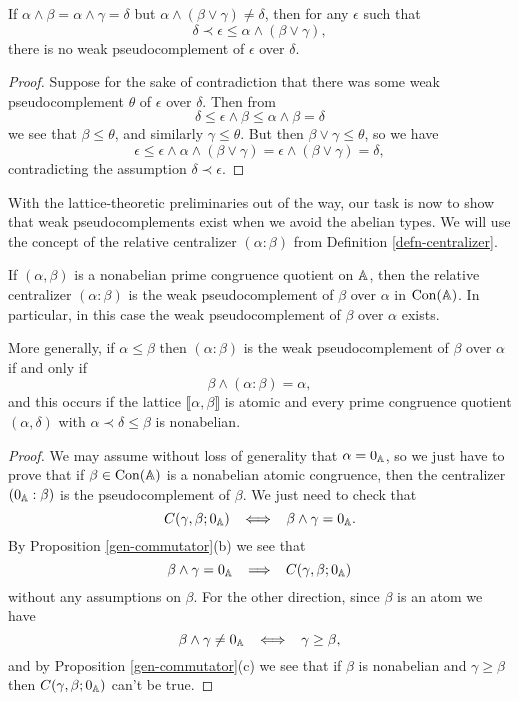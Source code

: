 \begin{appendices}
\begin{prop}\label{prop-semidistributive-prime-pseudocomplement} If $\alpha \wedge \beta = \alpha \wedge \gamma = \delta$ but $\alpha \wedge (\beta \vee \gamma) \ne \delta$, then for any $\epsilon$ such that
\[
\delta \prec \epsilon \le \alpha \wedge (\beta \vee \gamma),
\]
there is no weak pseudocomplement of $\epsilon$ over $\delta$.
\end{prop}
\begin{proof} Suppose for the sake of contradiction that there was some weak pseudocomplement $\theta$ of $\epsilon$ over $\delta$. Then from
\[
\delta \le \epsilon \wedge \beta \le \alpha \wedge \beta = \delta
\]
we see that $\beta \le \theta$, and similarly $\gamma \le \theta$. But then $\beta \vee \gamma \le \theta$, so we have
\[
\epsilon \le \epsilon \wedge \alpha \wedge (\beta \vee \gamma) = \epsilon \wedge (\beta \vee \gamma) = \delta,
\]
contradicting the assumption $\delta \prec \epsilon$.
\end{proof}

With the lattice-theoretic preliminaries out of the way, our task is now to show that weak pseudocomplements exist when we avoid the abelian types. We will use the concept of the relative centralizer $(\alpha : \beta)$ from Definition \ref{defn-centralizer}.

\begin{prop}\label{prop-centralizer-pseudocomplement} If $(\alpha, \beta)$ is a nonabelian prime congruence quotient on $\mathbb{A}$, then the relative centralizer $(\alpha : \beta)$ is the weak pseudocomplement of $\beta$ over $\alpha$ in $\operatorname{Con}(\mathbb{A})$. In particular, in this case the weak pseudocomplement of $\beta$ over $\alpha$ exists.

More generally, if $\alpha \le \beta$ then $(\alpha : \beta)$ is the weak pseudocomplement of $\beta$ over $\alpha$ if and only if
\[
\beta \wedge (\alpha : \beta) = \alpha,
\]
and this occurs if the lattice $\llbracket \alpha, \beta \rrbracket$ is atomic and every prime congruence quotient $(\alpha,\delta)$ with $\alpha \prec \delta \le \beta$ is nonabelian.
\end{prop}
\begin{proof} We may assume without loss of generality that $\alpha = 0_{\mathbb{A}}$, so we just have to prove that if $\beta \in \operatorname{Con}(\mathbb{A})$ is a nonabelian atomic congruence, then the centralizer $(0_{\mathbb{A}} : \beta)$ is the pseudocomplement of $\beta$. We just need to check that
\[
C(\gamma, \beta; 0_{\mathbb{A}}) \;\; \iff \;\; \beta \wedge \gamma = 0_{\mathbb{A}}.
\]
By Proposition \ref{gen-commutator}(b) we see that
\[
\beta \wedge \gamma = 0_{\mathbb{A}} \;\; \implies \;\; C(\gamma, \beta; 0_{\mathbb{A}})
\]
without any assumptions on $\beta$. For the other direction, since $\beta$ is an atom we have
\[
\beta \wedge \gamma \ne 0_{\mathbb{A}} \;\; \iff \;\; \gamma \ge \beta,
\]
and by Proposition \ref{gen-commutator}(c) we see that if $\beta$ is nonabelian and $\gamma \ge \beta$ then $C(\gamma, \beta; 0_{\mathbb{A}})$ can't be true.


\end{proof}
\end{appendices}
